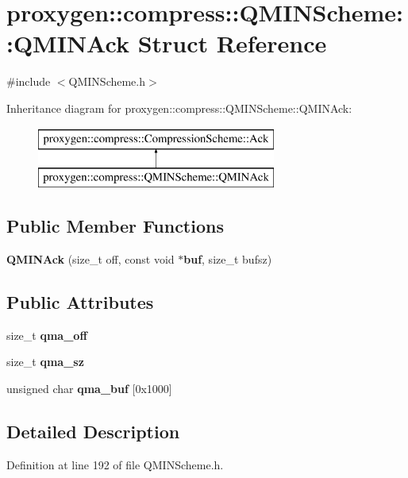 \section{proxygen\+:\+:compress\+:\+:Q\+M\+I\+N\+Scheme\+:\+:Q\+M\+I\+N\+Ack Struct Reference}
\label{structproxygen_1_1compress_1_1QMINScheme_1_1QMINAck}


{\ttfamily \#include $<$Q\+M\+I\+N\+Scheme.\+h$>$}

Inheritance diagram for proxygen\+:\+:compress\+:\+:Q\+M\+I\+N\+Scheme\+:\+:Q\+M\+I\+N\+Ack\+:\begin{figure}[H]
\begin{center}
\leavevmode
\includegraphics[height=2.000000cm]{structproxygen_1_1compress_1_1QMINScheme_1_1QMINAck}
\end{center}
\end{figure}
\subsection*{Public Member Functions}
\begin{DoxyCompactItemize}
\item 
{\bf Q\+M\+I\+N\+Ack} (size\+\_\+t off, const void $\ast${\bf buf}, size\+\_\+t bufsz)
\end{DoxyCompactItemize}
\subsection*{Public Attributes}
\begin{DoxyCompactItemize}
\item 
size\+\_\+t {\bf qma\+\_\+off}
\item 
size\+\_\+t {\bf qma\+\_\+sz}
\item 
unsigned char {\bf qma\+\_\+buf} [0x1000]
\end{DoxyCompactItemize}


\subsection{Detailed Description}


Definition at line 192 of file Q\+M\+I\+N\+Scheme.\+h.



